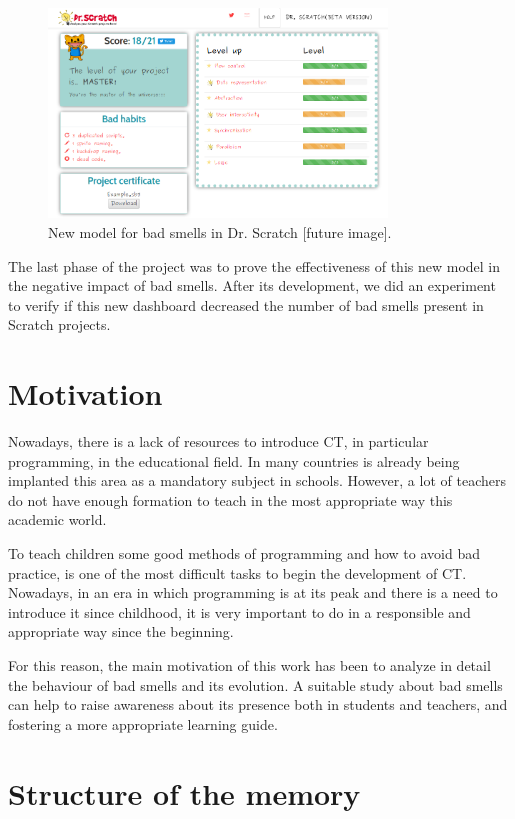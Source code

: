 \begin{figure}[h]
  \centering
  \includegraphics[width=9cm, keepaspectratio]{img/dashboards.png}
  \caption{New model for bad smells in Dr. Scratch [future image].}
  \label{fig:bad_smells}
\end{figure}

The last phase of the project was to prove the effectiveness of this new model in the negative impact of bad smells. After its development, we did an experiment to verify if this new dashboard decreased the number of bad smells present in Scratch projects.


\section{Motivation}
\label{sec:motivation}

Nowadays, there is a lack of resources to introduce CT, in particular programming, in the educational field. In many countries is already being implanted this area as a mandatory subject in schools. However, a lot of teachers do not have enough formation to teach in the most appropriate way this academic world. 

To teach children some good methods of programming and how to avoid bad practice, is one of the most difficult tasks to begin the development of CT. Nowadays, in an era in which programming is at its peak and there is a need to introduce it since childhood, it is very important to do in a responsible and appropriate way since the beginning. 

For this reason, the main motivation of this work has been to analyze in detail the behaviour of bad smells and its evolution. A suitable study about bad smells can help to raise awareness about its presence both in students and teachers, and fostering a more appropriate learning guide.


\section{Structure of the memory}
\label{sec:structure}


